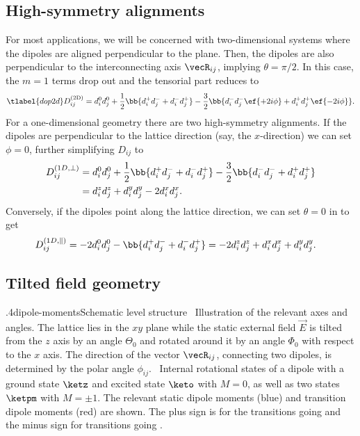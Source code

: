 \subsection{High-symmetry alignments}
For most applications, we will be concerned with two-dimensional systems where the dipoles are aligned perpendicular to the plane. Then, the dipoles are also perpendicular to the interconnecting axis $\vecR_{ij}$, implying $\theta = \pi/2$. In this case, the $m=1$ terms drop out and the tensorial part reduces to
\begin{align} \tlabel{dop2d}
    D^\text{(2D)}_{ij} = d_i^0 d_j^0 + \frac{1}{2}\bb{d_i^+ d_j^- + d_i^- d_j^+} -\frac{3}{2} \bb{ d_i^- d_j^- \ef{+2i\phi} + d_i^+ d_j^+ \ef{-2i\phi} }.
\end{align}
For a one-dimensional geometry there are two high-symmetry alignments. If the dipoles are perpendicular to the lattice direction (say, the $x$-direction) we can set $\phi=0$, further simplifying $D_{ij}$ to
\begin{align}
    D_{ij}^{(1D,\perp)} &= d_i^0 d_j^0 + \frac{1}{2}\bb{d_i^+ d_j^- + d_i^- d_j^+} -\frac{3}{2} \bb{d_i^- d_j^- + d_i^+ d_j^+} \\
 &= d_i^z d_j^z + d_i^y d_j^y - 2 d_i^x d_j^x.
\end{align}
Conversely, if the dipoles point along the lattice direction, we can set $\theta=0$ in  to get
\begin{align}
    D^{(1D,\parallel)}_{ij} &= -2 d_i^0 d_j^0 - \bb{d_i^+ d_j^- + d_i^- d_j^+} = -2 d_i^z d_j^z+ d_i^x d_j^x + d_i^y d_j^y.
\end{align}

\subsection{Tilted field geometry}
{.4}{dipole-moments}{Schematic level structure}
{\sfA~Illustration of the relevant axes and angles. The lattice lies in the $xy$ plane while the static external field $\vec{E}$ is tilted from the $z$ axis by an angle $\Theta_0$ and rotated around it by an angle $\Phi_0$ with respect to the $x$ axis. The direction of the vector $\vecR_{ij}$, connecting two dipoles, is determined by the polar angle $\phi_{ij}$.
\sfB~Internal rotational states of a dipole with a ground state $\ketz$ and excited state $\keto$ with $M=0$, as well as two states $\ketpm$ with $M=\pm 1$. The relevant static dipole moments (blue) and transition dipole moments (red) are shown. The plus sign is for the transitions going  and the minus sign for transitions going .}


